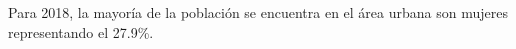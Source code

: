 Para 2018, la mayoría de la población se encuentra en el área urbana son mujeres representando el 27.9\%. 